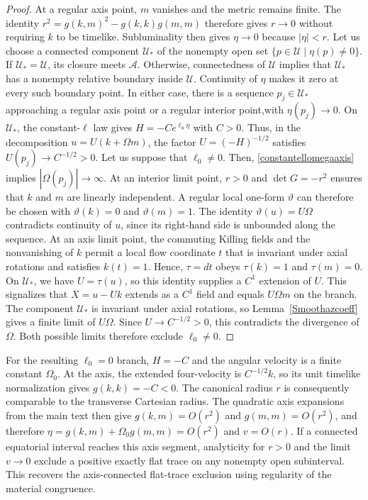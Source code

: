 \documentclass[amsmath,amsfonts,amssymb,aps,pra,superscriptaddress,10pt]{revtex4-2}
\numberwithin{equation}{section}
\theoremstyle{plain}
\theoremstyle{definition}
\theoremstyle{remark}
\theoremstyle{definition}
\newcommand{\ellzero}{\ell_0}
\begin{document}
\begin{proof}
At a regular axis point, $m$ vanishes and the metric remains finite. The identity $r^2=g(k,m)^2-g(k,k)g(m,m)$ therefore gives $r\to 0$ without requiring $k$ to be timelike. Subluminality then gives $\eta\to 0$ because $|\eta|<r$. Let us choose a connected component $\mathcal{U}_*$ of the nonempty open set $\{p\in\mathcal{U}\mid\eta(p)\neq 0\}$. If $\mathcal{U}_*=\mathcal{U}$, its closure meets $\mathcal{A}$. Otherwise, connectedness of $\mathcal{U}$ implies that $\mathcal{U}_*$ has a nonempty relative boundary inside $\mathcal{U}$. Continuity of $\eta$ makes it zero at every such boundary point. In either case, there is a sequence $p_j\in\mathcal{U}_*$ approaching a regular axis point or a regular interior point,with $\eta(p_j)\to 0$. On $\mathcal{U}_*$, the constant-$\ell$ law gives $H=-Ce^{\ellzero\eta}$ with $C>0$. Thus, in the decomposition $u=U(k+\Omega m)$, the factor $U=(-H)^{-1/2}$ satisfies $U(p_j)\to C^{-1/2}>0$. Let us suppose that $\ellzero\neq 0$. Then, \eqref{constantellomegaaxis} implies $|\Omega(p_j)|\to\infty$. At an interior limit point, $r>0$ and $\det G=-r^2$ ensures that $k$ and $m$ are linearly independent. A regular local one-form $\vartheta$ can therefore be chosen with $\vartheta(k)=0$ and $\vartheta(m)=1$. The identity $\vartheta(u)=U\Omega$ contradicts continuity of $u$, since its right-hand side is unbounded along the sequence. At an axis limit point, the commuting Killing fields and the nonvanishing of $k$ permit a local flow coordinate $t$ that is invariant under axial rotations and satisfies $k(t)=1$. Hence, $\tau=dt$ obeys $\tau(k)=1$ and $\tau(m)=0$. On $\mathcal{U}_*$, we have $U=\tau(u)$, so this identity supplies a $C^1$ extension of $U$. This signalizes that $X=u-Uk$ extends as a $C^1$ field and equals $U\Omega m$ on the branch. The component $\mathcal{U}_*$ is invariant under axial rotations, so Lemma~\ref{Smoothazcoeff} gives a finite limit of $U\Omega$. Since $U\to C^{-1/2}>0$, this contradicts the divergence of $\Omega$. Both possible limits therefore exclude $\ellzero\neq 0$.
\end{proof}

For the resulting $\ellzero=0$ branch, $H=-C$ and the angular velocity is a finite constant $\Omega_0$. At the axis, the extended four-velocity is $C^{-1/2}k$, so its unit timelike normalization gives $g(k,k)=-C<0$. The canonical radius $r$ is consequently comparable to the transverse Cartesian radius. The quadratic axis expansions from the main text then give $g(k,m)=O(r^2)$ and $g(m,m)=O(r^2)$, and therefore $\eta=g(k,m)+\Omega_0 g(m,m)=O(r^2)$ and $v=O(r)$. If a connected equatorial interval reaches this axis segment, analyticity for $r>0$ and the limit $v\to 0$ exclude a positive exactly flat trace on any nonempty open subinterval. This recovers the axis-connected flat-trace exclusion using regularity of the material congruence.
\end{document}
